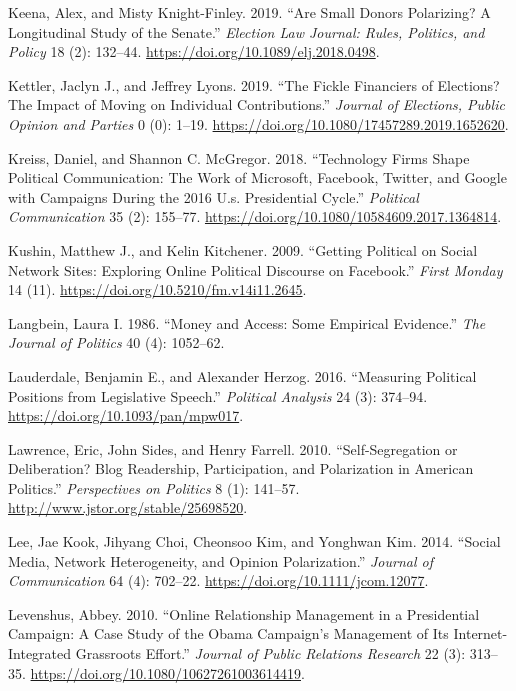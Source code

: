 \documentclass[12pt,]{article}
\begin{document}
\leavevmode\hypertarget{ref-keena2019}{}%
Keena, Alex, and Misty Knight-Finley. 2019. ``Are Small Donors
Polarizing? A Longitudinal Study of the Senate.'' \emph{Election Law
Journal: Rules, Politics, and Policy} 18 (2): 132--44.
\url{https://doi.org/10.1089/elj.2018.0498}.

\leavevmode\hypertarget{ref-kettler2019}{}%
Kettler, Jaclyn J., and Jeffrey Lyons. 2019. ``The Fickle Financiers of
Elections? The Impact of Moving on Individual Contributions.''
\emph{Journal of Elections, Public Opinion and Parties} 0 (0): 1--19.
\url{https://doi.org/10.1080/17457289.2019.1652620}.

\leavevmode\hypertarget{ref-kreiss2018}{}%
Kreiss, Daniel, and Shannon C. McGregor. 2018. ``Technology Firms Shape
Political Communication: The Work of Microsoft, Facebook, Twitter, and
Google with Campaigns During the 2016 U.s. Presidential Cycle.''
\emph{Political Communication} 35 (2): 155--77.
\url{https://doi.org/10.1080/10584609.2017.1364814}.

\leavevmode\hypertarget{ref-kushin2009}{}%
Kushin, Matthew J., and Kelin Kitchener. 2009. ``Getting Political on
Social Network Sites: Exploring Online Political Discourse on
Facebook.'' \emph{First Monday} 14 (11).
\url{https://doi.org/10.5210/fm.v14i11.2645}.

\leavevmode\hypertarget{ref-langbein1986}{}%
Langbein, Laura I. 1986. ``Money and Access: Some Empirical Evidence.''
\emph{The Journal of Politics} 40 (4): 1052--62.

\leavevmode\hypertarget{ref-lauderdale2016}{}%
Lauderdale, Benjamin E., and Alexander Herzog. 2016. ``Measuring
Political Positions from Legislative Speech.'' \emph{Political Analysis}
24 (3): 374--94. \url{https://doi.org/10.1093/pan/mpw017}.

\leavevmode\hypertarget{ref-lawrence2010}{}%
Lawrence, Eric, John Sides, and Henry Farrell. 2010. ``Self-Segregation
or Deliberation? Blog Readership, Participation, and Polarization in
American Politics.'' \emph{Perspectives on Politics} 8 (1): 141--57.
\url{http://www.jstor.org/stable/25698520}.

\leavevmode\hypertarget{ref-lee2014}{}%
Lee, Jae Kook, Jihyang Choi, Cheonsoo Kim, and Yonghwan Kim. 2014.
``Social Media, Network Heterogeneity, and Opinion Polarization.''
\emph{Journal of Communication} 64 (4): 702--22.
\url{https://doi.org/10.1111/jcom.12077}.

\leavevmode\hypertarget{ref-levenshus2010}{}%
Levenshus, Abbey. 2010. ``Online Relationship Management in a
Presidential Campaign: A Case Study of the Obama Campaign's Management
of Its Internet-Integrated Grassroots Effort.'' \emph{Journal of Public
Relations Research} 22 (3): 313--35.
\url{https://doi.org/10.1080/10627261003614419}.
\end{document}
